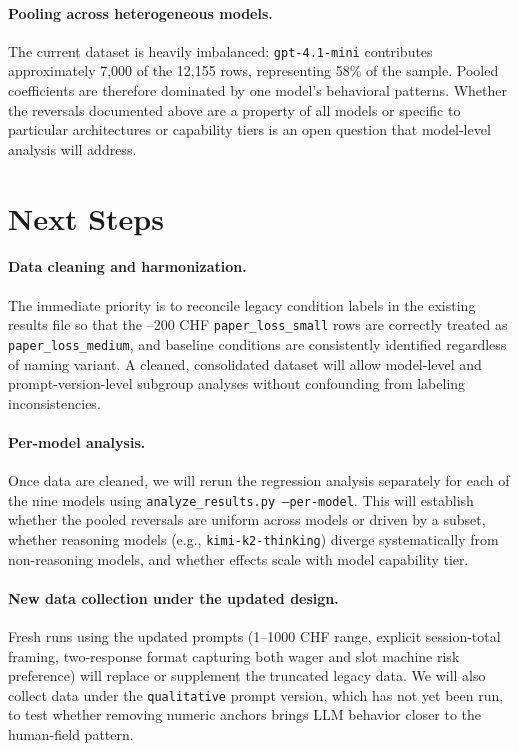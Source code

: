 \documentclass[midterm]{sparreport}
\begin{document}
\paragraph{Pooling across heterogeneous models.}
The current dataset is heavily imbalanced: \texttt{gpt-4.1-mini} contributes
approximately 7,000 of the 12,155 rows, representing 58\% of the sample. Pooled
coefficients are therefore dominated by one model's behavioral patterns. Whether
the reversals documented above are a property of all models or specific to
particular architectures or capability tiers is an open question that
model-level analysis will address.

\section{Next Steps}

\paragraph{Data cleaning and harmonization.}
The immediate priority is to reconcile legacy condition labels in the existing
results file so that the --200 CHF \texttt{paper\_loss\_small} rows are correctly
treated as \texttt{paper\_loss\_medium}, and baseline conditions are consistently
identified regardless of naming variant. A cleaned, consolidated dataset will allow
model-level and prompt-version-level subgroup analyses without confounding from
labeling inconsistencies.

\paragraph{Per-model analysis.}
Once data are cleaned, we will rerun the regression analysis separately for each of
the nine models using \texttt{analyze\_results.py --per-model}. This will establish
whether the pooled reversals are uniform across models or driven by a subset,
whether reasoning models (e.g., \texttt{kimi-k2-thinking}) diverge systematically
from non-reasoning models, and whether effects scale with model capability tier.

\paragraph{New data collection under the updated design.}
Fresh runs using the updated prompts (1--1000 CHF range, explicit session-total
framing, two-response format capturing both wager and slot machine risk preference)
will replace or supplement the truncated legacy data. We will also collect data
under the \texttt{qualitative} prompt version, which has not yet been run, to test
whether removing numeric anchors brings LLM behavior closer to the human-field
pattern.
\end{document}
